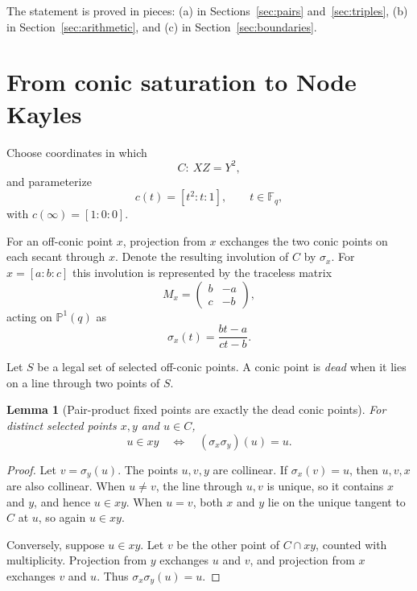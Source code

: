 \documentclass[11pt]{article}
\newtheorem{lemma}[theorem]{Lemma}
\theoremstyle{definition}
\theoremstyle{remark}
\newcommand{\PGL}{\mathrm{PGL}}
\newcommand{\PSL}{\mathrm{PSL}}
\newcommand{\F}{\mathbb{F}}
\newcommand{\PP}{\mathbb{P}}
\newif\ifdraftnotes
\newcommand{\phasenote}[2]{%
  \ifdraftnotes
    \par\smallskip\noindent
    \fbox{\parbox{0.96\linewidth}{\footnotesize\textbf{[#1 owed]}\ #2}}%
    \par\smallskip
  \fi}
\begin{document}
The statement is proved in pieces: (a) in Sections~\ref{sec:pairs} and~\ref{sec:triples}, (b) in
Section~\ref{sec:arithmetic}, and (c) in Section~\ref{sec:boundaries}.

\phasenote{C307}{Theorem~\ref{thm:main} is stated here at the strength the migrated source
manuscript proves. C307 extends it to the polyhedral families using the C284 completeness theorem,
the C289 $\rho$ refinement, and the C290 congruence laws, and must name the three exclusions
(off-conic continuation, wild characteristic, growing full/subfield $\PSL_2/\PGL_2$ groups) in the
same breath, per Fable's answer~(10).}

\section{From conic saturation to Node Kayles}
\label{sec:reduction}

Choose coordinates in which
\[
  C:\ XZ=Y^2,
\]
and parameterize
\[
  c(t)=[t^2:t:1],\qquad t\in\F_q,
\]
with $c(\infty)=[1:0:0]$.

For an off-conic point $x$, projection from $x$ exchanges the two conic points on each secant
through $x$. Denote the resulting involution of $C$ by $\sigma_x$. For $x=[a:b:c]$ this involution
is represented by the traceless matrix
\[
  M_x=\begin{pmatrix} b&-a\\ c&-b\end{pmatrix},
\]
acting on $\PP^1(q)$ as
\begin{equation}
  \sigma_x(t)=\frac{bt-a}{ct-b}.
  \label{eq:involution}
\end{equation}

Let $S$ be a legal set of selected off-conic points. A conic point is \emph{dead} when it lies on a
line through two points of $S$.

\begin{lemma}[Pair-product fixed points are exactly the dead conic points]
\label{lem:dead}
For distinct selected points $x,y$ and $u\in C$,
\begin{equation}
  u\in xy \quad\Longleftrightarrow\quad (\sigma_x\sigma_y)(u)=u .
  \label{eq:dead}
\end{equation}
\end{lemma}

\begin{proof}
Let $v=\sigma_y(u)$. The points $u,v,y$ are collinear. If $\sigma_x(v)=u$, then $u,v,x$ are also
collinear. When $u\ne v$, the line through $u,v$ is unique, so it contains $x$ and $y$, and hence
$u\in xy$. When $u=v$, both $x$ and $y$ lie on the unique tangent to $C$ at $u$, so again $u\in xy$.

Conversely, suppose $u\in xy$. Let $v$ be the other point of $C\cap xy$, counted with multiplicity.
Projection from $y$ exchanges $u$ and $v$, and projection from $x$ exchanges $v$ and $u$. Thus
$\sigma_x\sigma_y(u)=u$.
\end{proof}
\end{document}
